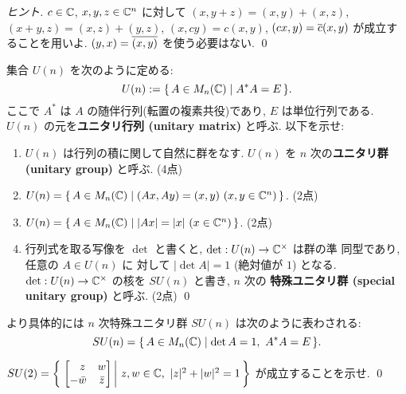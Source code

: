 \documentclass[12pt,twoside]{jarticle}
\begin{document}
\begin{proof}[ヒント]
 $c\in{\mathbb C}$, $x,y,z\in{\mathbb C}^n$ に対して %
 $(x,y+z)=(x,y)+(x,z)$, 
 $(x+y,z)=(x,z)+(y,z)$, 
 $(x,cy)=c(x,y)$, 
 $(cx,y)=\overline{c}(x,y)$ が成立することを用いよ.
 $(y,x)=\overline{(x,y)}$ を使う必要はない.
 \qed
\end{proof}

\begin{question}
 集合 $U(n)$ を次のように定める:
 \begin{equation*}
  U(n) := \{\, A\in M_n({\mathbb C}) \mid A^*A=E \,\}.
 \end{equation*}
 ここで $A^*$ は $A$ の随伴行列(転置の複素共役)であり, $E$ は単位行列である.
 $U(n)$ の元を{\bf ユニタリ行列 (unitary matrix)} と呼ぶ.
 以下を示せ:
 \begin{enumerate}
  \item $U(n)$ は行列の積に関して自然に群をなす.
   $U(n)$ を $n$ 次の{\bf ユニタリ群 (unitary group)} と呼ぶ.
   (4点)
  \item $U(n)=\{\, A\in M_n({\mathbb C}) \mid (Ax,Ay)=(x,y) \ (x,y\in{\mathbb C}^n) \,\}$.
   (2点)
  \item $U(n)=\{\, A\in M_n(\C) \mid |Ax|=|x| \ (x\in\C^n) \,\}$.
   (2点)
  \item 行列式を取る写像を $\det$ と書くと, $\det:U(n)\to{\mathbb C}^\times$ は群の準
   同型であり, 任意の $A\in U(n)$ に
   対して $|\det A| = 1$ (絶対値が $1$) となる.
   $\det:U(n)\to{\mathbb C}^\times$ の核を $SU(n)$ と書き, $n$ 次の
   {\bf 特殊ユニタリ群 (special unitary group)} と呼ぶ.
   (2点)
   \qed
 \end{enumerate}
\end{question}

より具体的には $n$ 次特殊ユニタリ群 $SU(n)$ は次のように表わされる:
\begin{equation*}
 SU(n) = \{\, A\in M_n({\mathbb C}) \mid \det A = 1,\ A^*A = E \,\}.
\end{equation*}


\begin{question}
 \(
    SU(2) = 
    \left\{\,
      \left.
      \begin{bmatrix}
        \phantom{-} z &    w    \\
           -  \bar{w} & \bar{z} \\
      \end{bmatrix}
      \,\right|\,
        z,w\in{\mathbb C},\ |z|^2+|w|^2 = 1
    \,\right\}
 \)
 が成立することを示せ. \qed
\end{question}
\end{document}

